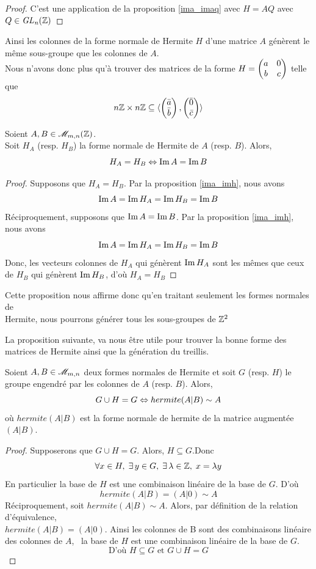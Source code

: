 \documentclass[12pt]{article}
\begin{document}
\begin{proof}
	C'est une application de la proposition \ref{ima_imaq} avec $H= AQ$ avec $Q \in \it {GL}_n(\mathbb Z)$

\end{proof}

Ainsi les colonnes de la forme normale de Hermite $H$ d'une matrice $A$ génèrent le même
sous-groupe que les colonnes de $A$.\\
Nous n'avons donc plus qu'à trouver des matrices de la forme
$H = \begin{pmatrix} a & 0\\ b & c \end{pmatrix}$ telle que
$$n\mathbb Z \times n\mathbb Z \subseteq \langle \begin{pmatrix} \bar a\\ \bar b \end{pmatrix},\begin{pmatrix} \bar 0\\ \bar c \end{pmatrix} \rangle$$

\begin{proposition}\label{ha_hb_ssi_ima_imb}
	Soient $A,B \in \mathscr{M}_{m,n}(\mathbb Z)$.\\
	Soit $H_A$ (resp. $H_B$) la forme normale de Hermite de $A$ (resp. $B$). Alors,
	$$ H_A = H_B \Leftrightarrow \operatorname{Im} A = \operatorname{Im} B$$
\end{proposition}

\begin{proof}
	Supposons que $H_A = H_B$.	Par la proposition \ref{ima_imh}, nous avons
	$$\operatorname{Im} A = \operatorname{Im} H_A = \operatorname{Im} H_B = \operatorname{Im} B$$
	Réciproquement, supposons que $\operatorname{Im} A = \operatorname{Im} B$. Par la proposition \ref{ima_imh}, nous avons
	$$\operatorname{Im} A = \operatorname{Im} H_A = \operatorname{Im} H_B = \operatorname{Im} B$$
	Donc, les vecteurs colonnes de $H_A$ qui génèrent $\operatorname{Im} H_A$ sont les mêmes que ceux de
	$H_B$ qui génèrent $\operatorname{Im} H_B$, d'où $H_A = H_B$

\end{proof}

\newpage
Cette proposition nous affirme donc qu'en traitant seulement les formes normales de \\
Hermite, nous pourrons générer tous les sous-groupes de $\mathbb Z^2$

La proposition suivante, va nous être utile pour trouver la bonne forme des matrices de Hermite
ainsi que la génération du treillis.

\begin{proposition}\label{guh_g_ssi_hab_sim_b}
	Soient $A,B \in \mathscr{M}_{m,n}$ deux formes normales de Hermite et soit $G$ (resp. $H$) le
	groupe engendré par les colonnes de $A$ (resp. $B$). Alors,
	$$G \cup H = G \Leftrightarrow hermite(A | B) \sim A$$
	où $hermite(A|B)$ est la forme normale de hermite de la matrice augmentée $(A | B)$.
\end{proposition}

\begin{proof}
	Supposerons que $G \cup H = G$. Alors, $ H \subseteq G$.Donc
	$$\forall x \in H , \;  \exists \, y \in G , \; \exists \, \lambda \in \mathbb Z , \; x = \lambda y$$
	En particulier la base de $H$ est une combinaison linéaire de la base de $G$. D'où
	$$hermite(A | B) = (A | 0) \sim A$$
	\noindent
	Réciproquement, soit $hermite(A | B) \sim A$. Alors, par définition de la relation
	d'équivalence,\\
	$hermite(A | B) = (A | 0)$. Ainsi les colonnes de B sont des combinaisons linéaire des
	colonnes de $A$, \cad \, la base de $H$ est une combinaison linéaire de la base de $G$.
	$$\text{D'où } H \subseteq G \text{ et } G \cup H = G$$
\end{proof}
\end{document}
